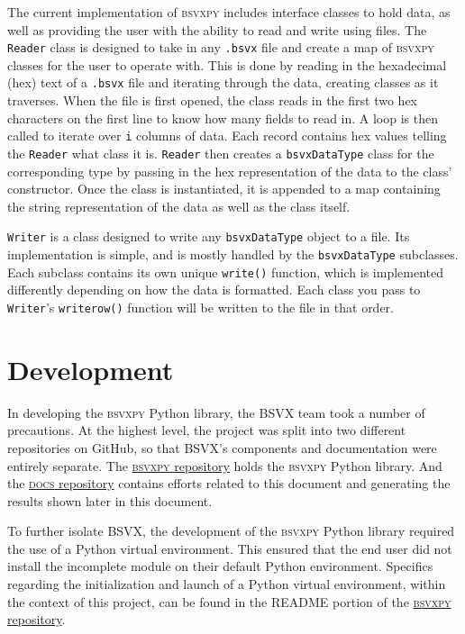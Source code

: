 \documentclass[10pt]{article}
\begin{document}
\indent{}
The current implementation of \textsc{bsvxpy} includes interface classes to hold data, as well as providing the user with the ability to read and write using files.
The \texttt{Reader} class is designed to take in any \texttt{.bsvx} file and create a map of \textsc{bsvxpy} classes for the user to operate with.
This is done by reading in the hexadecimal (hex) text of a \texttt{.bsvx} file and iterating through the data, creating classes as it traverses.
When the file is first opened, the class reads in the first two hex characters on the first line to know how many fields to read in.
A loop is then called to iterate over \texttt{i} columns of data.
Each record contains hex values telling the \texttt{Reader} what class it is.
\texttt{Reader} then creates a \texttt{bsvxDataType} class for the corresponding type by passing in the hex representation of the data to the class’ constructor.
Once the class is instantiated, it is appended to a map containing the string representation of the data as well as the class itself.

\indent{}
\texttt{Writer} is a class designed to write any \texttt{bsvxDataType} object to a file.
Its implementation is simple, and is mostly handled by the \texttt{bsvxDataType} subclasses.
Each subclass contains its own unique \texttt{write()} function, which is implemented differently depending on how the data is formatted.
Each class you pass to \texttt{Writer}’s \texttt{writerow()} function will be written to the file in that order. 

\section*{Development}

In developing the \textsc{bsvxpy} Python library, the BSVX team took a number of precautions.
At the highest level, the project was split into two different repositories on GitHub, so that BSVX's components and documentation were entirely separate.
The \href{https://github.com/bsvx/bsvxpy}{\textsc{bsvxpy} repository} holds the \textsc{bsvxpy} Python library.
And the \href{https://github.com/bsvx/docs}{\textsc{docs} repository} contains efforts related to this document and generating the results shown later in this document.

\indent{}
To further isolate BSVX, the development of the \textsc{bsvxpy} Python library required the use of a Python virtual environment.
This ensured that the end user did not install the incomplete module on their default Python environment.
Specifics regarding the initialization and launch of a Python virtual environment, within the context of this project, can be found in the README portion of the \href{https://github.com/bsvx/bsvxpy}{\textsc{bsvxpy} repository}.
\end{document}
